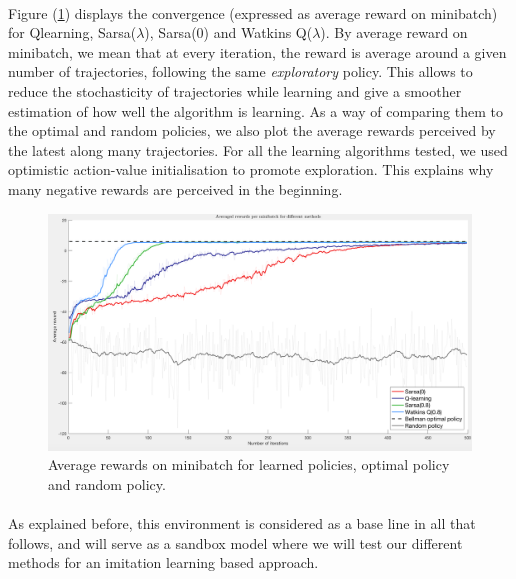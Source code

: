 \documentclass[a4paper]{report}
\begin{document}
{{			
						
			\paragraph{} Figure (\ref{fig::comp_maze}) displays the convergence (expressed as average reward on minibatch) for Qlearning, Sarsa($\lambda$), Sarsa(0) and Watkins Q($\lambda$). By average reward on minibatch, we mean that at every iteration, the reward is average around a given number of trajectories, following the same \emph{exploratory} policy. This allows to reduce the stochasticity of trajectories while learning and give a smoother estimation of how well the algorithm is learning. As a way of comparing them to the optimal and random policies, we also plot the average rewards perceived by the latest along many trajectories. \newline
For all the learning algorithms tested, we used optimistic action-value initialisation to promote exploration. This explains why many negative rewards are perceived in the beginning. 
				
			\begin{figure}
				\begin{center}
					\includegraphics[width=\linewidth]{comp_maze}
					\caption{Average rewards on minibatch for learned policies, optimal policy and random policy.}
					\label{fig::comp_maze}
				\end{center}
			\end{figure}
		
			\paragraph{} As explained before, this environment is considered as a base line in all that follows, and will serve as a sandbox model where we will test our different methods for an imitation learning based approach. 
		}
		
}
\end{document}
